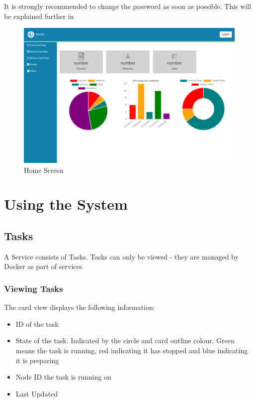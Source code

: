 \documentclass[]{article}
\providecommand{\tightlist}{%
	\setlength{\itemsep}{0pt}\setlength{\parskip}{0pt}}
\begin{document}
It is strongly recommended to change the password as soon as possible.
This will be explained further in 

\begin{figure}[H]
	\centering
	\includegraphics[scale=0.4]{home.png}
	\caption{Home Screen}
\end{figure}

\section{Using the System}


\subsection{Tasks}
A Service consists of Tasks. Tasks can only be viewed - they are managed by Docker
as part of services

\subsubsection{Viewing Tasks}
The card view displays the following information:
\begin{itemize}
	\tightlist
	\item ID of the task
	\item State of the task. 
	Indicated by the circle and card outline colour. 
	Green means the task is running, 
	red indicating it has stopped and blue indicating it is preparing
	\item Node ID the task is running on
	\item Last Updated
\end{itemize}
\end{document}
